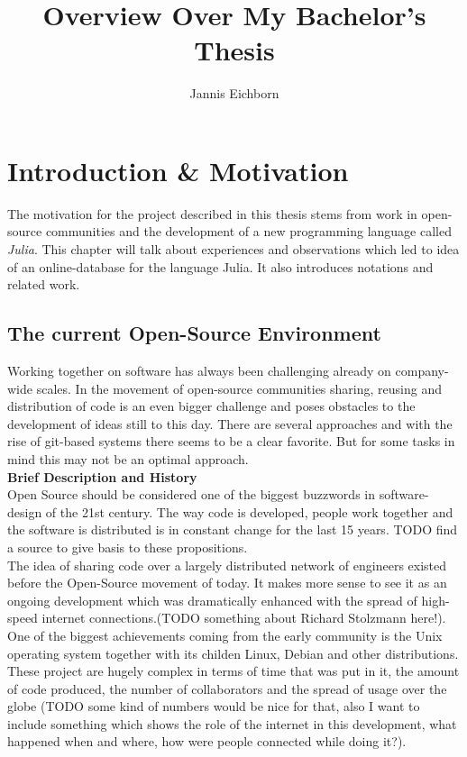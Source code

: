 \documentclass[twoside, 11pt]{scrartcl}
\title{Overview Over My Bachelor's Thesis}
\author{Jannis Eichborn}
\begin{document}
\begin{titlepage}
\maketitle
\tableofcontents
\end{titlepage}

\section{Introduction \& Motivation}
\label{sec:introduction}
The motivation for the project described in this thesis stems from work in open-source communities and the development of a new programming language called \textit{Julia}. This chapter will talk about experiences and observations which led to idea of an online-database for the language Julia. It also introduces notations and related work.
\subsection{The current Open-Source Environment}
Working together on software has always been challenging already on company-wide scales.  In the movement of open-source communities sharing, reusing and distribution of code is an even bigger challenge and poses obstacles to the development of ideas still to this day. There are several approaches and with the rise of git-based systems there seems to be a clear favorite. But for some tasks in mind this may not be an optimal approach.\\

\textbf{Brief Description and History}\\
Open Source should be considered one of the biggest buzzwords in software-design of the 21st century. The way code is developed, people work together and the software is distributed is in constant change for the last 15 years. TODO find a source to give basis to these propositions.\\

The idea of sharing code over a largely distributed network of engineers existed before the Open-Source movement of today. It makes more sense to see it as an ongoing development which was dramatically enhanced with the spread of high-speed internet connections.(TODO something about Richard Stolzmann here!). One of the biggest achievements coming from the early community is the Unix operating system together with its childen Linux, Debian and other distributions.
These project are hugely complex in terms of time that was put in it, the amount of code produced, the number of collaborators and the spread of usage over the globe (TODO some kind of numbers would be nice for that, also I want to include something which shows the role of the internet in this development, what happened when and where, how were people connected while doing it?).
\end{document}
